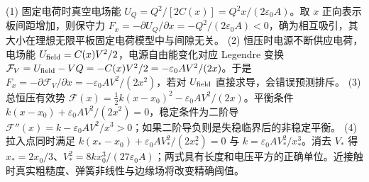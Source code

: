 (1) 固定电荷时真空电场能 \(U_Q=Q^2/[2C(x)]=Q^2x/(2\varepsilon_0A)\)。取 \(x\) 正向表示板间距增加，则保守力 \(F_x=-\partial U_Q/\partial x=-Q^2/(2\varepsilon_0A)<0\)，确为相互吸引，其大小在理想无限平板固定电荷模型中与间隙无关。
(2) 恒压时电源不断供应电荷，电场能 \(U_{\rm field}=C(x)V^2/2\)，电源自由能变化对应 Legendre 变换 \(\mathcal F_V=U_{\rm field}-VQ=-C(x)V^2/2=-\varepsilon_0AV^2/(2x)\)。于是 \(F_x=-\partial\mathcal F_V/\partial x=-\varepsilon_0AV^2/(2x^2)\)，若对 \(U_{\rm field}\) 直接求导，会错误预测排斥。
(3) 总恒压有效势 \(\mathcal F(x)=\frac12k(x-x_0)^2-\varepsilon_0AV^2/(2x)\)。平衡条件 \(k(x-x_0)+\varepsilon_0AV^2/(2x^2)=0\)，稳定条件为二阶导 \(\mathcal F''(x)=k-\varepsilon_0AV^2/x^3>0\)；如果二阶导负则是失稳临界后的非稳定平衡。
(4) 拉入点同时满足 \(k(x_*-x_0)+\varepsilon_0AV_*^2/(2x_*^2)=0\) 与 \(k=\varepsilon_0AV_*^2/x_*^3\)。消去 \(V_*\) 得 \(x_*=2x_0/3\)、\(V_*^2=8kx_0^3/(27\varepsilon_0A)\)；两式具有长度和电压平方的正确单位。近接触时真实粗糙度、弹簧非线性与边缘场将改变精确阈值。
